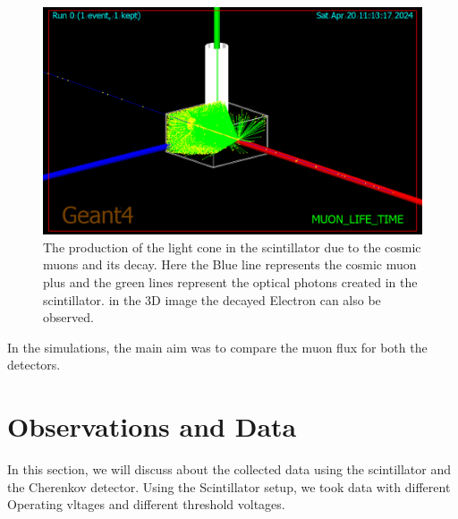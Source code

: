 \documentclass{article}
\begin{document}
\begin{multicols}{2}
\begin{figure}[H]
    \centering
    \includegraphics[width = \columnwidth]{Images/scint_sim_2.png}
    \caption{The production of the light cone in the scintillator due to the cosmic muons and its decay. Here the Blue line represents the cosmic muon plus and the green lines represent the optical photons created in the scintillator. in the 3D image the decayed Electron can also be observed.}
    \label{sim_run}
\end{figure}


In the simulations, the main aim was to compare the muon flux for both the detectors. 


\section{\label{observations}Observations and Data}

In this section, we will discuss about the collected data using the scintillator and the Cherenkov detector. Using the Scintillator setup, we took data with different Operating vltages and different threshold voltages.



\end{multicols}
\end{document}
